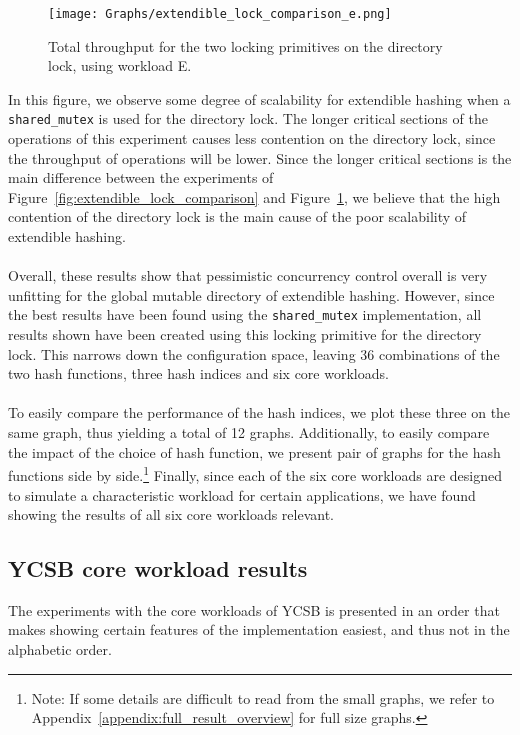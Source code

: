 \documentclass[11pt]{report} %
\begin{document}
\begin{figure}[H]
  \centering
  \texttt{[image: Graphs/extendible\_lock\_comparison\_e.png]}\\
  \caption{Total throughput for the two locking primitives on the directory lock, using workload E.}\label{fig:extendible_lock_comparison_e}
\end{figure}
\noindent
In this figure, we observe some degree of scalability for extendible hashing when a \verb|shared_mutex| is used for the directory lock. The longer critical sections of the operations of this experiment causes less contention on the directory lock, since the throughput of operations will be lower. Since the longer critical sections is the main difference between the experiments of Figure~\ref{fig:extendible_lock_comparison} and Figure~\ref{fig:extendible_lock_comparison_e}, we believe that the high contention of the directory lock is the main cause of the poor scalability of extendible hashing.\\
\\
Overall, these results show that pessimistic concurrency control overall is very unfitting for the global mutable directory of extendible hashing. However, since the best results have been found using the \verb|shared_mutex| implementation, all results shown have been created using this locking primitive for the directory lock. This narrows down the configuration space, leaving 36 combinations of the two hash functions, three hash indices and six core workloads. \\
\\
To easily compare the performance of the hash indices, we plot these three on the same graph, thus yielding a total of 12 graphs. Additionally, to easily compare the impact of the choice of hash function, we present pair of graphs for the hash functions side by side.\footnote{Note: If some details are difficult to read from the small graphs, we refer to Appendix~\ref{appendix:full_result_overview} for full size graphs.} Finally, since each of the six core workloads are designed to simulate a characteristic workload for certain applications, we have found showing the results of all six core workloads relevant. 
\subsection{YCSB core workload results}
\label{subsec:ycsb_results}
The experiments with the core workloads of YCSB is presented in an order that makes showing certain features of the implementation easiest, and thus not in the alphabetic order. 
\end{document}
